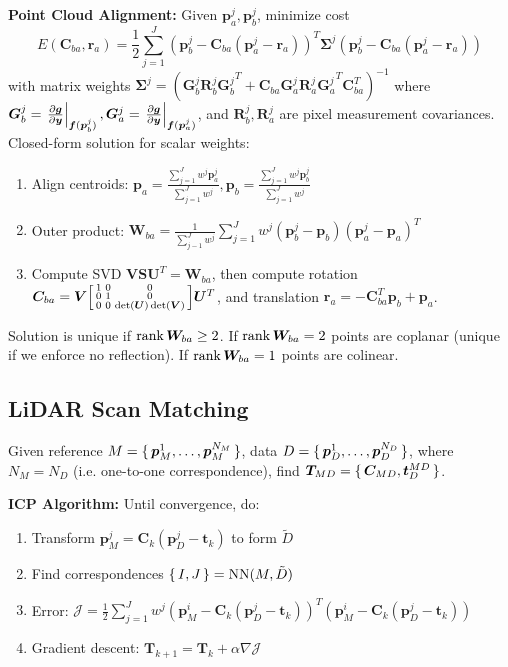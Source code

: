 \documentclass[twocolumn, 8pt]{extarticle}
\begin{document}
\textbf{Point Cloud Alignment:} Given \(\bm p_a^j, \bm p_b^j\), minimize cost
\[E(\bm C_{ba}, \bm r_a) = \frac{1}{2}\sum _{j = 1}^J \left(\bm p_b^j - \bm C_{ba}(\bm p_a^j - \bm r_a)\right)^T\bm\Sigma^j\left(\bm p_b^j - \bm C_{ba}(\bm p_a^j - \bm r_a)\right)\]
with matrix weights \(\bm\Sigma^j = \left(\bm G_b^j\bm R_b^j{\bm G_b^j}^T + \bm C_{ba}\bm G_a^j\bm R_a^j{\bm G_a^j}^T\bm C_{ba}^T\right)^{-1}\)
where \(\bm G_b^j = \left.\frac{\partial\bm g}{\partial\bm y}\right\rvert_{\bm f(\bm p_b^j)}, \bm G_a^j = \left.\frac{\partial\bm g}{\partial\bm y}\right\rvert_{\bm f(\bm p_a^j)}\), and $\bm R_b^j, \bm R_a^j$ are pixel measurement covariances.
Closed-form solution for scalar weights:
\begin{enumerate}
	\item Align centroids: $\displaystyle\bm p_a = \frac{\sum _{j = 1}^J w^j\bm p_a^j}{\sum _{j = 1}^J w^j}, \bm p_b = \frac{\sum _{j = 1}^J w^j\bm p_b^j}{\sum _{j = 1}^J w^j}$
	\item Outer product: $\displaystyle\bm W_{ba} = \frac{1}{\sum _{j - 1}^J w^j}\sum _{j = 1}^J w^j(\bm p_b^j - \bm p_b)(\bm p_a^j - \bm p_a)^T$
	\item Compute SVD $\bm V\bm S\bm U^T = \bm W_{ba}$, then compute rotation \(\bm C_{ba} = \bm V\matthree[bsmall]{1}{0}{0}{0}{1}{0}{0}{0}{\det(\bm U)\det(\bm V)}\bm U^T\),
        and translation \(\bm r_a = -\bm C_{ba}^T\bm p_b + \bm p_a\).
\end{enumerate}

Solution is unique if \(\operatorname{rank}\bm W_{ba} \geq 2\). If \(\operatorname{rank}\bm W_{ba} = 2\) points are coplanar (unique if we enforce
no reflection). If \(\operatorname{rank}\bm W_{ba} = 1\) points are colinear.

\subsection{LiDAR Scan Matching}

Given reference $M = \set{\bm p_M^1, \dots, \bm p_M^{N_M}}$, data $D = \set{\bm p_D^1, \dots, \bm p_D^{N_D}}$, where
$N_M = N_D$ (i.e. one-to-one correspondence), find \(\bm T_{MD} = \set{\bm C_{MD}, \bm t_D^{MD}}\).

\textbf{ICP Algorithm:} Until convergence, do:
\begin{enumerate}
	\item Transform $\bm p_M^j = \bm C_k(\bm p_D^j - \bm t_k)$ to form $\tilde D$
  \item Find correspondences $\set{I, J} = \operatorname{NN}(M, \tilde D)$
	\item Error: $\mathcal J = \frac{1}{2}\sum _{j = 1}^J w^j\left(\bm p_M^i - \bm C_k\left(\bm p_D^j - \bm t_k\right)\right)^T\left(\bm p_M^i - \bm C_k\left(\bm p_D^j - \bm t_k\right)\right)$
  \item Gradient descent: $\bm T_{k + 1} = \bm T_k + \alpha\nabla\mathcal J$
\end{enumerate}
\end{document}
